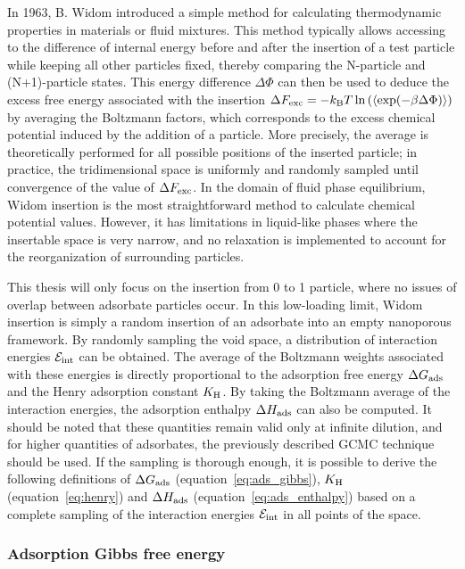 \documentclass[main.tex]{subfiles}
\begin{document}
In 1963, B. Widom introduced a simple method for calculating thermodynamic properties in materials or fluid mixtures.\autocite{Widom1963} This method typically allows accessing to the difference of internal energy before and after the insertion of a test particle while keeping all other particles fixed, thereby comparing the N-particle and (N+1)-particle states. This energy difference $\Delta \Phi$ can then be used to deduce the excess free energy associated with the insertion $\Delta F_{\text{exc}} = -k_{\text{B}} T \ln\left(\langle \exp(- \beta\Delta \Phi) \rangle\right)$ by averaging the Boltzmann factors, which corresponds to the excess chemical potential induced by the addition of a particle. More precisely, the average is theoretically performed for all possible positions of the inserted particle; in practice, the tridimensional space is uniformly and randomly sampled until convergence of the value of $\Delta F_{\text{exc}}$. In the domain of fluid phase equilibrium, Widom insertion is the most straightforward method to calculate chemical potential values. However, it has limitations in liquid-like phases where the insertable space is very narrow, and no relaxation is implemented to account for the reorganization of surrounding particles.\autocite{Nezbeda_1991} 

This thesis will only focus on the insertion from 0 to 1 particle, where no issues of overlap between adsorbate particles occur. In this low-loading limit, Widom insertion is simply a random insertion of an adsorbate into an empty nanoporous framework. By randomly sampling the void space, a distribution of interaction energies $\mathcal{E}_{\text{int}}$ can be obtained. The average of the Boltzmann weights associated with these energies is directly proportional to the adsorption free energy $\Delta G_{\text{ads}}$ and the Henry adsorption constant $K_{\text{H}}$. By taking the Boltzmann average of the interaction energies, the adsorption enthalpy $\Delta H_{\text{ads}}$ can also be computed. It should be noted that these quantities remain valid only at infinite dilution, and for higher quantities of adsorbates, the previously described GCMC technique should be used. If the sampling is thorough enough, it is possible to derive the following definitions of $\Delta G_{\text{ads}}$ (equation~\ref{eq:ads_gibbs}), $K_{\text{H}}$ (equation~\ref{eq:henry}) and $\Delta H_{\text{ads}}$ (equation~\ref{eq:ads_enthalpy}) based on a complete sampling of the interaction energies $\mathcal{E}_{\text{int}}$ in all points of the space. 

\subsubsection{Adsorption Gibbs free energy}
\end{document}
